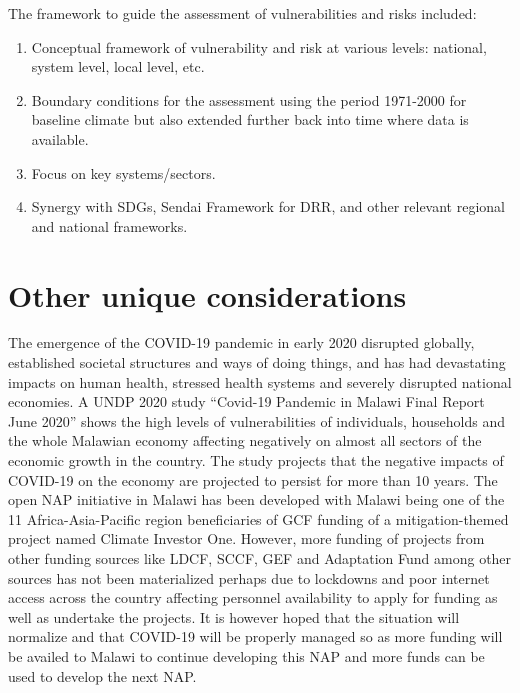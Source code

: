 \documentclass[
]{book}
\providecommand{\tightlist}{%
  \setlength{\itemsep}{0pt}\setlength{\parskip}{0pt}}
\begin{document}
The framework to guide the assessment of vulnerabilities and risks included:

\begin{enumerate}
\def\labelenumi{\roman{enumi}.}
\tightlist
\item
  Conceptual framework of vulnerability and risk at various levels: national, system level, local level, etc.
\item
  Boundary conditions for the assessment using the period 1971-2000 for baseline climate but also extended further back into time where data is available.
\item
  Focus on key systems/sectors.
\item
  Synergy with SDGs, Sendai Framework for DRR, and other relevant regional and national frameworks.
\end{enumerate}

\hypertarget{other-unique-considerations}{%
\section{Other unique considerations}\label{other-unique-considerations}}

The emergence of the COVID-19 pandemic in early 2020 disrupted globally, established societal structures and ways of doing things, and has had devastating impacts on human health, stressed health systems and severely disrupted national economies. A UNDP 2020 study ``Covid-19 Pandemic in Malawi Final Report June 2020'' shows the high levels of vulnerabilities of individuals, households and the whole Malawian economy affecting negatively on almost all sectors of the economic growth in the country. The study projects that the negative impacts of COVID-19 on the economy are projected to persist for more than 10 years. The open NAP initiative in Malawi has been developed with Malawi being one of the 11 Africa-Asia-Pacific region beneficiaries of GCF funding of a mitigation-themed project named Climate Investor One. However, more funding of projects from other funding sources like LDCF, SCCF, GEF and Adaptation Fund among other sources has not been materialized perhaps due to lockdowns and poor internet access across the country affecting personnel availability to apply for funding as well as undertake the projects. It is however hoped that the situation will normalize and that COVID-19 will be properly managed so as more funding will be availed to Malawi to continue developing this NAP and more funds can be used to develop the next NAP.
\end{document}
